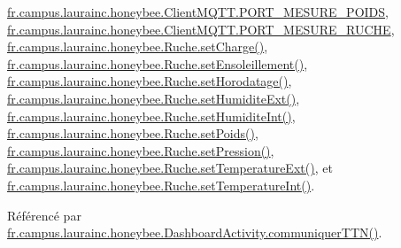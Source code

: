 \hyperlink{classfr_1_1campus_1_1laurainc_1_1honeybee_1_1_client_m_q_t_t_a3630b0b9b902fee6796995399bee1a6a}{fr.\+campus.\+laurainc.\+honeybee.\+Client\+M\+Q\+T\+T.\+P\+O\+R\+T\+\_\+\+M\+E\+S\+U\+R\+E\+\_\+\+P\+O\+I\+DS}, \hyperlink{classfr_1_1campus_1_1laurainc_1_1honeybee_1_1_client_m_q_t_t_a3f264a8d2f3c294241bbe5557aa66770}{fr.\+campus.\+laurainc.\+honeybee.\+Client\+M\+Q\+T\+T.\+P\+O\+R\+T\+\_\+\+M\+E\+S\+U\+R\+E\+\_\+\+R\+U\+C\+HE}, \hyperlink{classfr_1_1campus_1_1laurainc_1_1honeybee_1_1_ruche_a02299f4e79c0396df8e2fe000628b5cc}{fr.\+campus.\+laurainc.\+honeybee.\+Ruche.\+set\+Charge()}, \hyperlink{classfr_1_1campus_1_1laurainc_1_1honeybee_1_1_ruche_a19b9dae9928c6d8267c7c7c7ca3375aa}{fr.\+campus.\+laurainc.\+honeybee.\+Ruche.\+set\+Ensoleillement()}, \hyperlink{classfr_1_1campus_1_1laurainc_1_1honeybee_1_1_ruche_ae6a0d7783c6d429a28f1513201928909}{fr.\+campus.\+laurainc.\+honeybee.\+Ruche.\+set\+Horodatage()}, \hyperlink{classfr_1_1campus_1_1laurainc_1_1honeybee_1_1_ruche_a7d9bd771e570edc523ae02fe574676f3}{fr.\+campus.\+laurainc.\+honeybee.\+Ruche.\+set\+Humidite\+Ext()}, \hyperlink{classfr_1_1campus_1_1laurainc_1_1honeybee_1_1_ruche_a1a5bbd259b54c895833c9e3710d2eead}{fr.\+campus.\+laurainc.\+honeybee.\+Ruche.\+set\+Humidite\+Int()}, \hyperlink{classfr_1_1campus_1_1laurainc_1_1honeybee_1_1_ruche_a0d85ef1bc9f53591e6cf0cc8667fbe2d}{fr.\+campus.\+laurainc.\+honeybee.\+Ruche.\+set\+Poids()}, \hyperlink{classfr_1_1campus_1_1laurainc_1_1honeybee_1_1_ruche_a149083353b1430ef67fef5de226f8947}{fr.\+campus.\+laurainc.\+honeybee.\+Ruche.\+set\+Pression()}, \hyperlink{classfr_1_1campus_1_1laurainc_1_1honeybee_1_1_ruche_a5f3aa639b62e7bebcec6532be378964d}{fr.\+campus.\+laurainc.\+honeybee.\+Ruche.\+set\+Temperature\+Ext()}, et \hyperlink{classfr_1_1campus_1_1laurainc_1_1honeybee_1_1_ruche_a4bed1041019b54d79beb46d36aae0adb}{fr.\+campus.\+laurainc.\+honeybee.\+Ruche.\+set\+Temperature\+Int()}.



Référencé par \hyperlink{classfr_1_1campus_1_1laurainc_1_1honeybee_1_1_dashboard_activity_abfefd572745e1034a025bc836812ae4f}{fr.\+campus.\+laurainc.\+honeybee.\+Dashboard\+Activity.\+communiquer\+T\+T\+N()}.


